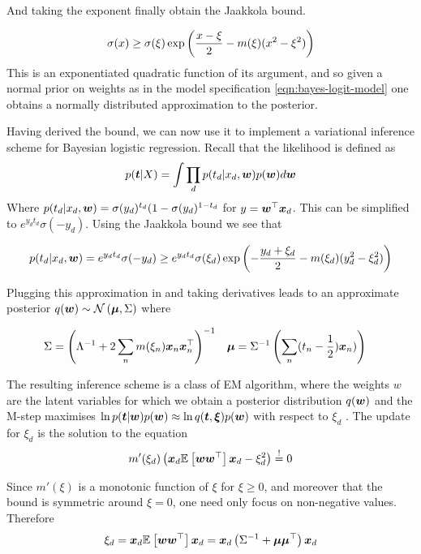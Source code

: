 And taking the exponent finally obtain the Jaakkola\cite{Jaakkola1997} bound.

\begin{align}
\sigma(x) \geq \sigma(\xi)\exp \left(\frac{x - \xi}{2} - m(\xi)(x^2 - \xi^2) \right)
\end{align}
This is an exponentiated quadratic function of its argument, and so given a normal prior on weights as in the model specification \eqref{eqn:bayes-logit-model} one obtains a normally distributed approximation to the posterior.

Having derived the bound, we can now use it to implement a variational inference scheme for Bayesian logistic regression. Recall that the likelihood is defined as
\begin{align}
p(\bm t|X) = \int \prod_d p(t_d | x_d, \bm w) p(\bm w) d\bm w
\end{align}
Where $p(t_d | x_d, \bm w) = \sigma(y_d)^{t_d}(1- \sigma(y_d)^{1-t_d}$ for $y = \bm w^\top\bm x_d$. This can be simplified to $e^{y_d t_d}\sigma(-y_d)$. Using the Jaakkola bound we see that

\begin{equation}
p(t_d | x_d, \bm w) = e^{y_d t_d}\sigma(-y_d) \geq e^{y_d t_d} \sigma(\xi_d) \exp\left( -\frac{y_d + \xi_d}{2} - m(\xi_d)(y_d^2 - \xi_d^2)\right)
\end{equation}

Plugging this approximation in and taking derivatives leads to an approximate posterior $q(\bm w) \sim \mathcal{N} \left( {\bm \mu}, {\Sigma} \right)$ where

\begin{align}
\Sigma & = {\left( {\Lambda}^{-1} + 2 \sum_n m(\xi_n)\bm x_n\bm x_n^\top \right)}^{-1} & \bm \mu & = {\Sigma}^{-1} \left(\sum_n (t_n - \frac{1}{2}) \bm x_n)\right)
\end{align}

The resulting inference scheme is a class of EM algorithm, where the weights $w$ are the latent variables for which we obtain a posterior distribution $q(\bm w)$ and the M-step maximises $\ln p(\bm t| \bm w)p(\bm w) \approx \ln q(\bm t, \bm \xi)p(\bm w)$  with respect to $\xi_d$ . The update for $\xi_d$ is the solution to the equation
\begin{align}
m'(\xi_d) \left( \bm x_d \mathbb{E}_{ {  } }\left[ \bm w\bm w^\top \right]\bm x_d - \xi^2_d \right) \overset{!}{=} 0
\end{align}

Since $m'(\xi)$ is a monotonic function of $\xi$ for $\xi \geq 0$, and moreover that the bound is symmetric around $\xi = 0$, one need only focus on non-negative values. Therefore
\begin{align}
\xi_d = \bm x_d \mathbb{E}_{ {  } }\left[ \bm w \bm w^\top  \right] \bm x_d = \bm x_d \left( {\Sigma}^{-1} + \bm \mu \bm \mu^\top \right) \bm x_d
\end{align}

